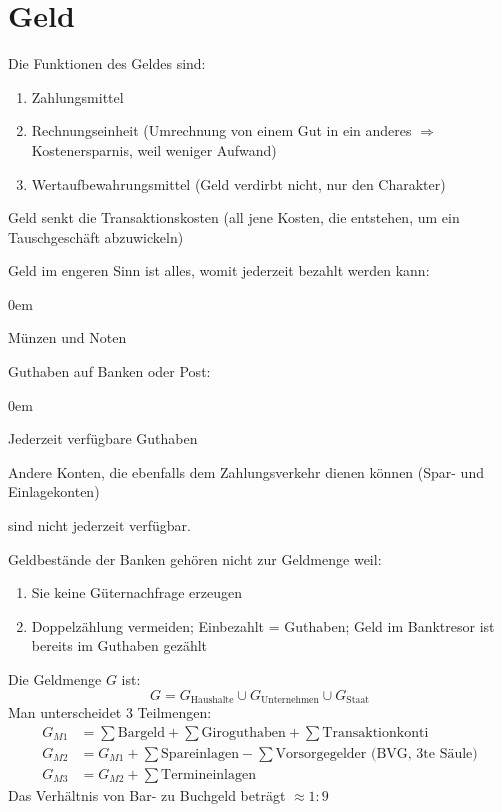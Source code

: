 \section{Geld}

Die Funktionen des Geldes sind:
\begin{enumerate}\itemsep0em
	\item Zahlungsmittel
	\item Rechnungseinheit (Umrechnung von einem Gut in ein anderes $\Rightarrow$ Kostenersparnis, 
	weil weniger Aufwand)
	\item Wertaufbewahrungsmittel (Geld verdirbt nicht, nur den Charakter)
\end{enumerate}
Geld senkt die Transaktionskosten (all jene Kosten, die entstehen, um ein Tauschgeschäft abzuwickeln)

Geld im engeren Sinn ist alles, womit jederzeit bezahlt werden kann:
\begin{description}\itemsep0em
	\item [Bargeld] Münzen und Noten
	\item [Buchgeld] Guthaben auf Banken oder Post:
		\begin{description}\itemsep0em
		\item [Sicht-/Giroguthaben, Kontokorrentkonten] Jederzeit verfügbare Guthaben
		\item [Transaktionskonti] Andere Konten, die ebenfalls dem Zahlungsverkehr dienen können (Spar- und Einlagekonten)
		\end{description}
	\item [Spar- und Termineinlagen] sind nicht jederzeit verfügbar.
\end{description}

Geldbestände der Banken gehören nicht zur Geldmenge weil:
\begin{enumerate}\itemsep0em
	\item Sie keine Güternachfrage erzeugen
	\item Doppelzählung vermeiden; Einbezahlt = Guthaben; Geld im Banktresor ist bereits im Guthaben gezählt
\end{enumerate}
Die Geldmenge $G$ ist:
\begin{equation*}
	G = G_{\mbox{Haushalte}} \cup G_{\mbox{Unternehmen}} \cup G_{\mbox{Staat}}
\end{equation*}
Man unterscheidet 3 Teilmengen:
\begin{align*}
	G_{M1} & = \sum \mbox{Bargeld} + \sum \mbox{Giroguthaben} + \sum \mbox{Transaktionkonti}\\
	G_{M2} & = G_{M1} + \sum \mbox{Spareinlagen} - \sum \mbox{Vorsorgegelder (BVG, 3te Säule)}\\
	G_{M3} & = G_{M2} + \sum \mbox{Termineinlagen}
\end{align*}
Das Verhältnis von Bar- zu Buchgeld beträgt $\approx 1 : 9$ 

